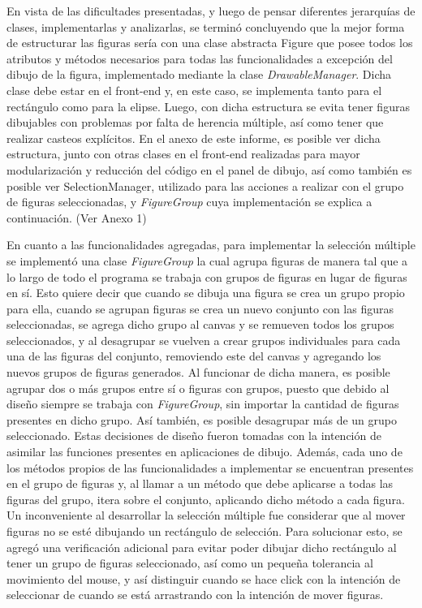 \documentclass[12pt]{article}
\begin{document}
En vista de las dificultades presentadas, y luego de pensar diferentes jerarquías de clases, implementarlas y analizarlas, se terminó concluyendo que la mejor forma de estructurar las figuras sería con una clase abstracta Figure que posee todos los atributos y métodos necesarios para todas las funcionalidades a excepción del dibujo de la figura, implementado mediante la clase \textit{DrawableManager}. Dicha clase debe estar en el front-end y, en este caso, se implementa tanto para el rectángulo como para la elipse. Luego, con dicha estructura se evita tener figuras dibujables con problemas por falta de herencia múltiple, así como tener que realizar casteos explícitos. En el anexo de este informe, es posible ver dicha estructura, junto con otras clases en el front-end realizadas para mayor modularización y reducción del código en el panel de dibujo, así como también es posible ver SelectionManager, utilizado para las acciones a realizar con el grupo de figuras seleccionadas, y \textit{FigureGroup} cuya implementación se explica a continuación. (Ver Anexo 1)

En cuanto a las funcionalidades agregadas, para implementar la selección múltiple se implementó una clase \textit{FigureGroup} la cual agrupa figuras de manera tal que a lo largo de todo el programa se trabaja con grupos de figuras en lugar de figuras en sí. Esto quiere decir que cuando se dibuja una figura se crea un grupo propio para ella, cuando se agrupan figuras se crea un nuevo conjunto con las figuras seleccionadas, se agrega dicho grupo al canvas y se remueven todos los grupos seleccionados, y al desagrupar se vuelven a crear grupos individuales para cada una de las figuras del conjunto, removiendo este del canvas y agregando los nuevos grupos de figuras generados. Al funcionar de dicha manera, es posible agrupar dos o más grupos entre sí o figuras con grupos, puesto que debido al diseño siempre se trabaja con \textit{FigureGroup}, sin importar la cantidad de figuras presentes en dicho grupo. Así también, es posible desagrupar más de un grupo seleccionado. Estas decisiones de diseño fueron tomadas con la intención de asimilar las funciones presentes en aplicaciones de dibujo. Además, cada uno de los métodos propios de las funcionalidades a implementar se encuentran presentes en el grupo de figuras y, al llamar a un método que debe aplicarse a todas las figuras del grupo, itera sobre el conjunto, aplicando dicho método a cada figura. Un inconveniente al desarrollar la selección múltiple fue considerar que al mover figuras no se esté dibujando un rectángulo de selección. Para solucionar esto, se agregó una verificación adicional para evitar poder dibujar dicho rectángulo al tener un grupo de figuras seleccionado, así como un pequeña tolerancia al movimiento del mouse, y así distinguir cuando se hace click con la intención de seleccionar de cuando se está arrastrando con la intención de mover figuras.
\end{document}
